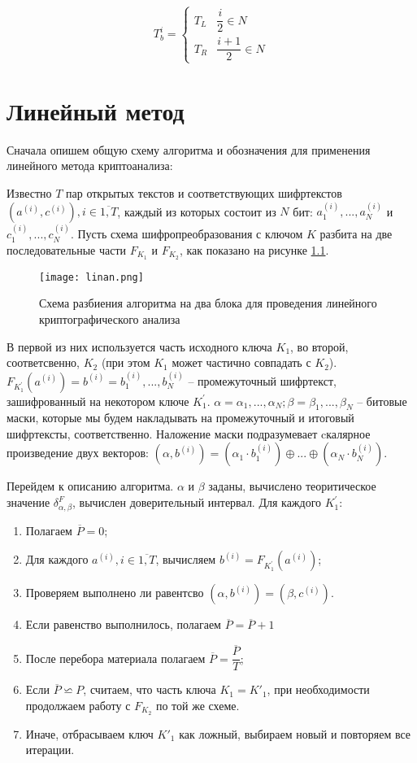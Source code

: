 \documentclass[utf8x, 14pt]{G7-32} %
\begin{document}
$$ T_b^i =
\begin{cases}
T_L & \dfrac{i}{2} \in N \\
T_R & \dfrac{i+1}{2} \in N
\end{cases} $$

\chapter{Линейный метод}

Сначала опишем общую схему алгоритма и обозначения для применения линейного метода криптоанализа:

Известно $T$ пар открытых текстов и соответствующих шифртекстов $(a^{(i)}, c^{(i)}), i\in\overline{1,T}$, каждый из которых состоит из $N$ бит: $a_1^{(i)}, ..., a_N^{(i)}$ и $c_1^{(i)}, ..., c_N^{(i)}$. Пусть схема шифропреобразования с ключом $K$ разбита на две последовательные части $F_{K_1}$ и $F_{K_2}$, как показано на рисунке \ref{fig:linan}. 
\begin{figure}[h!]
	\centering
	\texttt{[image: linan.png]}
	\caption{Схема разбиения алгоритма на два блока для проведения линейного криптографического анализа}
	\label{fig:linan}
\end{figure}
В первой из них используется часть исходного ключа $K_1$, во второй, соответсвенно, $K_2$ (при этом $K_1$ может частично совпадать с $K_2$). $F_{K_1^{'}}(a^{(i)}) = b^{(i)} = b_1^{(i)}, ..., b_N^{(i)}$ -- промежуточный шифртекст, зашифрованный на некотором ключе $K_1^{'}$. $\alpha = \alpha_1, ..., \alpha_N; \beta = \beta_1, ..., \beta_N$ -- битовые маски, которые мы будем накладывать на промежуточный и итоговый шифртексты, соответственно. Наложение маски подразумевает cкалярное произведение двух векторов: $(\alpha, b^{(i)}) = (\alpha_1 \cdot b_1^{(i)}) \oplus ... \oplus (\alpha_N \cdot b_N^{(i)})$.

Перейдем к описанию алгоритма. $\alpha$ и $\beta$ заданы, вычислено теоритическое значение $\delta_{\alpha, \beta}^F$, вычислен доверительный интервал. Для каждого $K_1^{'}$:

\begin{enumerate}
    \item Полагаем $\overline{P} = 0$;
    \item Для каждого $a^{(i)}, i\in\overline{1,T}$, вычисляем $b^{(i)} = F_{K_1^{'}}(a^{(i)})$; 
    \item Проверяем выполнено ли равентсво $(\alpha, b^{(i)}) = (\beta, c^{(i)})$. 
    \item Если равенство выполнилось, полагаем $\overline{P} = \overline{P} + 1$
    \item После перебора материала полагаем $\overline{P} = \dfrac{\overline{P}}{T}$;
    \item Если $\overline{P} \backsimeq P$, считаем, что часть ключа $K_1 = K'_1$, при необходимости продолжаем работу с $F_{K_2}$ по той же схеме.
    \item Иначе, отбрасываем ключ $K'_1$ как ложный, выбираем новый и повторяем все итерации.
\end{enumerate}
\end{document}
